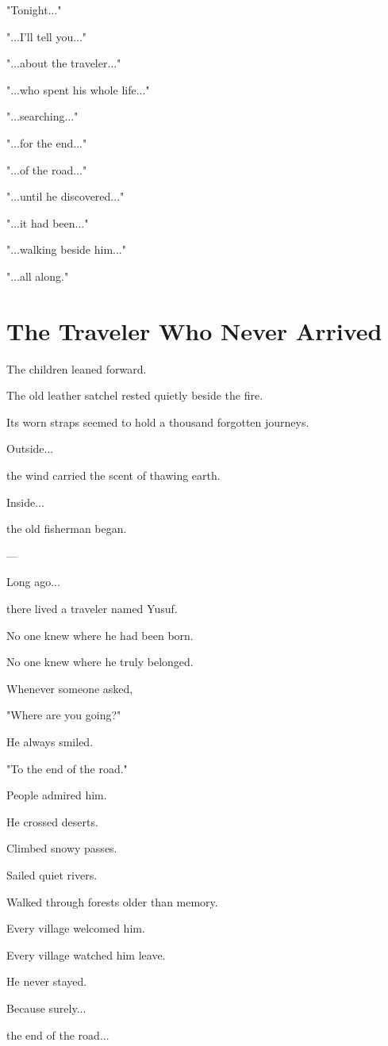 \documentclass[12pt,openany]{book}
\begin{document}
"Tonight..."

"...I'll tell you..."

"...about the traveler..."

"...who spent his whole life..."

"...searching..."

"...for the end..."

"...of the road..."

"...until he discovered..."

"...it had been..."

"...walking beside him..."

"...all along."
\section*{The Traveler Who Never Arrived}

The children leaned forward.

The old leather satchel rested quietly beside the fire.

Its worn straps seemed to hold a thousand forgotten journeys.

Outside...

the wind carried the scent of thawing earth.

Inside...

the old fisherman began.

---

Long ago...

there lived a traveler named Yusuf.

No one knew where he had been born.

No one knew where he truly belonged.

Whenever someone asked,

"Where are you going?"

He always smiled.

"To the end of the road."

People admired him.

He crossed deserts.

Climbed snowy passes.

Sailed quiet rivers.

Walked through forests older than memory.

Every village welcomed him.

Every village watched him leave.

He never stayed.

Because surely...

the end of the road...
\end{document}
